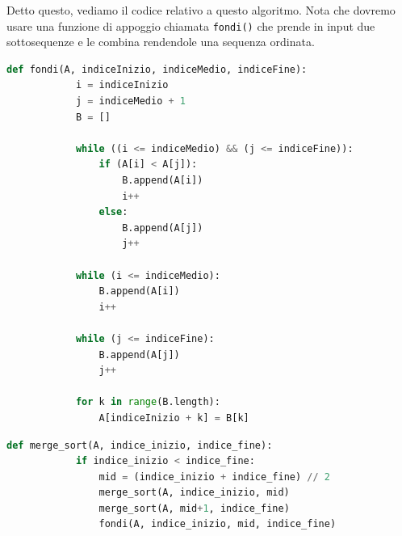 \documentclass[12pt]{report}
\begin{document}
    Detto questo, vediamo il codice relativo a questo algoritmo. Nota che dovremo usare una funzione di appoggio chiamata \texttt{fondi()} che prende in input due sottosequenze e le combina rendendole una sequenza ordinata.
    
    \begin{lstlisting}[language=Python, caption={Funzione di appoggio per la fusione}]
    	def fondi(A, indiceInizio, indiceMedio, indiceFine):
    		i = indiceInizio
    		j = indiceMedio + 1
    		B = []
    		
    		while ((i <= indiceMedio) && (j <= indiceFine)):
    			if (A[i] < A[j]):
    				B.append(A[i])
    				i++
    			else:
    				B.append(A[j])
    				j++
    		
    		while (i <= indiceMedio):
    			B.append(A[i])
    			i++
    		
    		while (j <= indiceFine):
    			B.append(A[j])
    			j++
    		
    		for k in range(B.length):
    			A[indiceInizio + k] = B[k]
    \end{lstlisting}
    
    \begin{lstlisting}[caption={Merge Sort}, language=Python]
    	def merge_sort(A, indice_inizio, indice_fine):
    		if indice_inizio < indice_fine:
    			mid = (indice_inizio + indice_fine) // 2
    			merge_sort(A, indice_inizio, mid)
    			merge_sort(A, mid+1, indice_fine)
    			fondi(A, indice_inizio, mid, indice_fine)
    \end{lstlisting}
    
\end{document}
